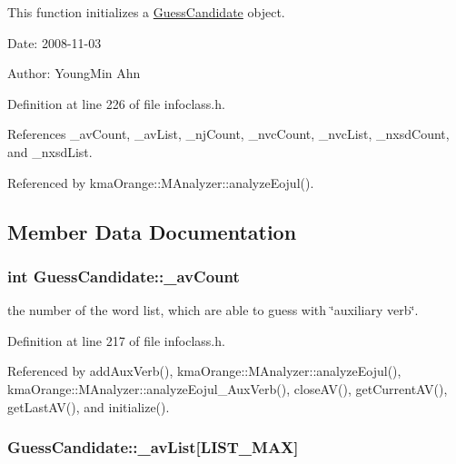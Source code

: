 This function initializes a \hyperlink{classGuessCandidate}{GuessCandidate} object. 

\begin{Desc}
\item[Date:]2008-11-03 \end{Desc}
\begin{Desc}
\item[Author:]YoungMin Ahn \end{Desc}


Definition at line 226 of file infoclass.h.

References \_\-avCount, \_\-avList, \_\-njCount, \_\-nvcCount, \_\-nvcList, \_\-nxsdCount, and \_\-nxsdList.

Referenced by kmaOrange::MAnalyzer::analyzeEojul().

\subsection{Member Data Documentation}
\hypertarget{classGuessCandidate_3a7ad0eae4852041514cbd517ea5920d}{
\subsubsection[{\_\-avCount}]{\setlength{\rightskip}{0pt plus 5cm}int {\bf GuessCandidate::\_\-avCount}}}
\label{classGuessCandidate_3a7ad0eae4852041514cbd517ea5920d}


the number of the word list, which are able to guess with \char`\"{}auxiliary verb\char`\"{}. 



Definition at line 217 of file infoclass.h.

Referenced by addAuxVerb(), kmaOrange::MAnalyzer::analyzeEojul(), kmaOrange::MAnalyzer::analyzeEojul\_\-AuxVerb(), closeAV(), getCurrentAV(), getLastAV(), and initialize().\hypertarget{classGuessCandidate_4eed8fd03e0f6d778e0ad6858dec266a}{
\subsubsection[{\_\-avList}]{ {\bf GuessCandidate::\_\-avList}\mbox{[}LIST\_\-MAX\mbox{]}}}
\label{classGuessCandidate_4eed8fd03e0f6d778e0ad6858dec266a}


